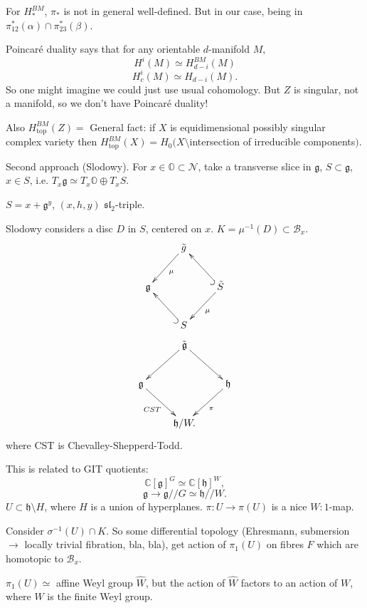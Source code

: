 For $H_*^{BM}$, $\pi_*$ is not
in general well-defined.
But in our case, being in
$\pi_{12}^* (\alpha)
\cap \pi_{23}^*(\beta)$.

\medskip\noindent
Poincaré duality says that for any
orientable $d$-manifold $M$,
$$
H^i(M) \simeq H_{d-i}^{BM}(M)
$$
$$
H^i_c(M) \simeq H_{d-i}(M).
$$
So one might imagine we could just use 
usual cohomology. But $Z$ is singular, not a
manifold, so we don't have Poincaré
duality!

Also $H^{BM}_{\operatorname{top}}
(Z) = $
General fact: if $X$ is equidimensional
possibly singular complex variety
then $H^{BM}_{\operatorname{top}}(X)
=H_0(X \setminus $intersection of
irreducible components$)$.

\medskip\noindent
Second approach (Slodowy).
For $x \in \mathbb{O} \subset \mathcal{N}$,
take a transverse slice in 
$\mathfrak{g}$, $S \subset \mathfrak{g}$,
$x \in S$, i.e.
$T_x \mathfrak{g} \simeq T_x
\mathbb{O} \oplus T_x S$.

\begin{example}
\label{example-}
$S = x + \mathfrak{g}^y$,
$(x,h,y)$ $\mathfrak{sl}_2$-triple.
\end{example}

\noindent
Slodowy considers a disc $D$ in $S$,
centered on $x$.
$K = \mu^{-1}(D)\subset \mathcal{B}_x$.
$$
\xymatrix{
&  \tilde{g}
\ar[dl]^{\mu}\\
\mathfrak{g}&  &  \tilde{S}\ar@{^{(}->}[ul]
\ar[dl]^{\mu}\\
&  S \ar@{^{(}->}[ul]
}
$$
$$
\xymatrix{
&\tilde{\mathfrak{g}}\ar[dl]
\ar[dr]\\
\mathfrak{g}\ar[dr]_{CST}&  &  \mathfrak{h}
\ar[dl]^{\pi}\\
& \mathfrak{h}/W.
}
$$
where CST is Chevalley-Shepperd-Todd.

This is related to GIT quotients:
$$
\mathbb{C}[\mathfrak{g}]^G
\simeq\mathbb{C}[\mathfrak{h}]^W,
$$
$$
\mathfrak{g} \to \mathfrak{g}//G
\simeq\mathfrak{h}//W.
$$
$U \subset \mathfrak{h}\setminus H$,
where $H$ is a union of hyperplanes.
$\pi:U \to \pi(U)$ is a nice $W:1$-map.

Consider $\sigma^{-1}(U) \cap K$.
So some differential topology
(Ehresmann, submersion $\to$ locally
trivial fibration, bla, bla),
get action of $\pi_1(U)$ on fibres $F$
which are homotopic to $\mathcal{B}_x$.

$\pi_1(U) \simeq$ affine Weyl group
$\hat{W}$, but the action of $\hat{W}$
factors to an action of $W$,
where $W$ is the finite Weyl group.


